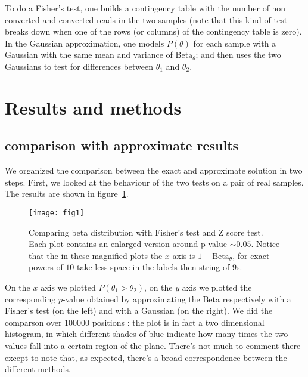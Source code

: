 \documentclass[11pt]{amsart}
\newcommand{\betapdf}{\mbox{Beta}_\theta}
\begin{document}
To do a Fisher's test, one builds a contingency table with the number of non converted and converted reads in the two samples (note that this kind of test breaks down when one of the rows (or columns) of the contingency table is zero). In the Gaussian approximation, one models $P(\theta)$ for each sample with a Gaussian with the same mean and variance of $\betapdf$; and then uses the two Gaussians to test for differences between $\theta_1$ and $\theta_2$. 
\section{Results and methods} 
\subsection{comparison with approximate results}
We organized the comparison between the exact and approximate solution in two steps. First,
we looked at the behaviour of the two tests on a pair of real samples. The results are shown in figure~\ref{cmpreal}.
\begin{figure}[h]
\caption{Comparing beta distribution with Fisher's test and Z score test. Each plot contains an enlarged version around p-value $\sim 0.05$. Notice that the in these magnified plots the $x$ axis is $1-\betapdf$, for exact powers of $10$ take less space in the labels then string of $9$s.}
\texttt{[image: fig1]}
\label{cmpreal}
\end{figure}
On the $x$ axis we plotted $P(\theta_1>\theta_2)$, on the $y$ axis we plotted the corresponding $p$-value obtained by approximating the Beta respectively with a Fisher's test (on the left) and with a Gaussian (on the right).
We did the comparson over $100000$ positions : the plot is in fact a two dimensional histogram, in which different shades of blue indicate how many times the two values fall into a certain region of the plane. There's not much to comment there except to note that, as expected, there's a broad correspondence between the different methods.
\end{document}
